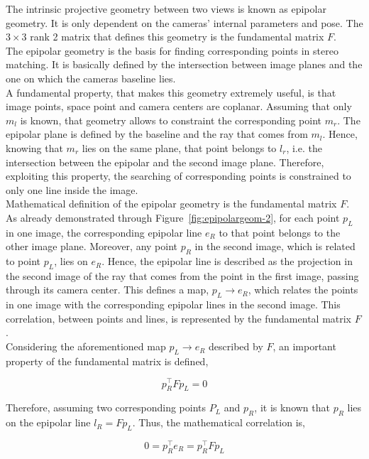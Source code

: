 The intrinsic projective geometry between two views is known as epipolar geometry.
It is only dependent on the cameras' internal parameters and pose.
The $3 \times 3$ rank 2 matrix that defines this geometry is the fundamental matrix $F$.\\
The epipolar geometry is the basis for finding corresponding points in stereo matching. 
It is basically defined by the intersection between image planes and the one on which the cameras baseline lies.\\
A fundamental property, that makes this geometry extremely useful, is that image points, space point and camera centers are coplanar. 
Assuming that only $m_l$ is known, that geometry allows to constraint the corresponding point $m_r$. 
The epipolar plane is defined by the baseline and the ray that comes from $m_l$. 
Hence, knowing that $m_r$ lies on the same plane, that point belongs to $l_r$, i.e. the intersection between the epipolar and the second image plane. 
Therefore, exploiting this property, the searching of corresponding points is constrained to only one line inside the image.\\
Mathematical definition of the epipolar geometry is the fundamental matrix $F$.
As already demonstrated through Figure~\ref{fig:epipolargeom-2}, for each point $p_L$ in one image, the corresponding epipolar line $e_R$ to that point belongs to the other image plane. 
Moreover, any point $p_R$ in the second image, which is related to point $p_L$, lies on $e_R$.
Hence, the epipolar line is described as the projection in the second image of the ray that comes from the point in the first image, passing through its camera center.
This defines a map, $p_L \rightarrow e_R$, which relates the points in one image with the corresponding epipolar lines in the second image.
This correlation, between points and lines, is represented by the fundamental matrix $F$.\\
Considering the aforementioned map $p_L \rightarrow e_R$ described by $F$, an important property of the fundamental matrix is defined,

\begin{equation}
\label{eqn:fundmatprop}
	p_R^\top F p_L = 0
\end{equation}

Therefore, assuming two corresponding points $P_L$ and $p_R$, it is known that $p_R$ lies on the epipolar line $l_R = F p_L$. 
Thus, the mathematical correlation is,

\begin{equation}
	0 = p_R^\top e_R = p_R^\top F p_L
\end{equation}

